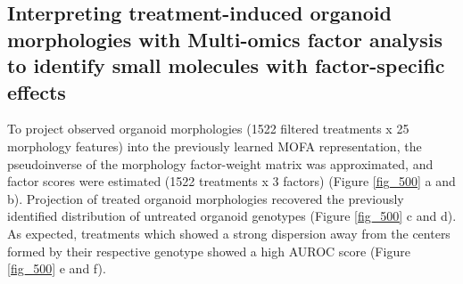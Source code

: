 \begin{flushleft}
\newpage
\section{Interpreting treatment-induced organoid morphologies with Multi-omics factor analysis to identify small molecules with factor-specific effects}

To project observed organoid morphologies (1522 filtered treatments x 25 morphology features) into the previously learned MOFA representation, the pseudoinverse of the morphology factor-weight matrix was approximated, and factor scores were estimated (1522 treatments x 3 factors) (Figure \ref{fig_500} a and b). Projection of treated organoid morphologies recovered the previously identified distribution of untreated organoid genotypes (Figure \ref{fig_500} c and d). As expected, treatments which showed a strong dispersion away from the centers formed by their respective genotype showed a high AUROC score (Figure \ref{fig_500} e and f).
\bigbreak


\end{flushleft}

